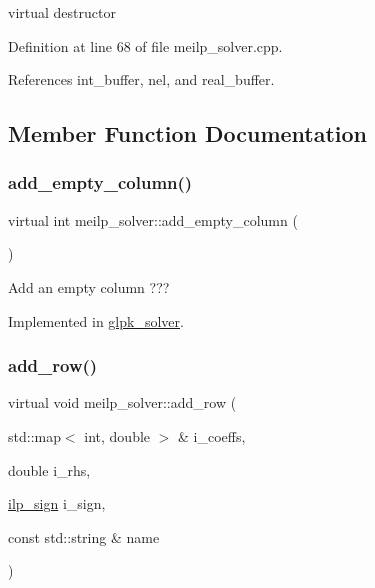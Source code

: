 virtual destructor 



Definition at line 68 of file meilp\+\_\+solver.\+cpp.



References int\+\_\+buffer, nel, and real\+\_\+buffer.



\subsection{Member Function Documentation}
\mbox{\label{classmeilp__solver_aa1fc55c72dd2b8cf1465dbf99e31127c}} 
\subsubsection{\texorpdfstring{add\+\_\+empty\+\_\+column()}{add\_empty\_column()}}
{\footnotesize\ttfamily virtual int meilp\+\_\+solver\+::add\+\_\+empty\+\_\+column (\begin{DoxyParamCaption}{ }\end{DoxyParamCaption})\hspace{0.3cm}{\ttfamily [pure virtual]}}



Add an empty column ??? 



Implemented in \hyperlink{classglpk__solver_a7f8f325055100b3b9a9d115b5bb2a613}{glpk\+\_\+solver}.

\mbox{\label{classmeilp__solver_a844cb83be66ee0afe42edc2a60fd17cf}} 
\subsubsection{\texorpdfstring{add\+\_\+row()}{add\_row()}}
{\footnotesize\ttfamily virtual void meilp\+\_\+solver\+::add\+\_\+row (\begin{DoxyParamCaption}\item[{std\+::map$<$ int, double $>$ \&}]{i\+\_\+coeffs,  }\item[{double}]{i\+\_\+rhs,  }\item[{\hyperlink{classmeilp__solver_a2cb689f3c242a34eb05cff99704a3e8e}{ilp\+\_\+sign}}]{i\+\_\+sign,  }\item[{const std\+::string \&}]{name }\end{DoxyParamCaption})\hspace{0.3cm}{\ttfamily [pure virtual]}}



